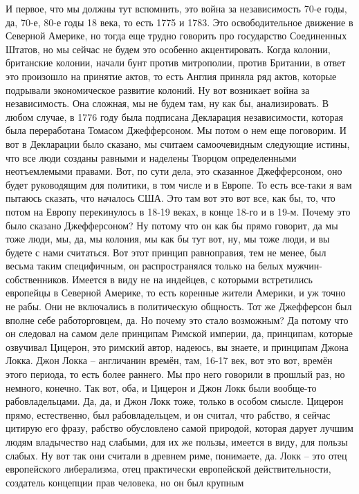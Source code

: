И первое, что мы
должны тут вспомнить, это война за независимость 70-е годы, да, 70-е, 80-е годы
18 века, то есть 1775 и 1783. Это освободительное движение в Северной Америке,
но тогда еще трудно говорить про государство Соединенных Штатов, но мы сейчас не
будем это особенно акцентировать. Когда колонии, британские колонии, начали бунт
против митрополии, против Британии, в ответ это произошло на принятие актов, то
есть Англия приняла ряд актов, которые подрывали экономическое развитие колоний.
Ну вот возникает война за независимость. Она сложная, мы не будем там, ну как
бы, анализировать. В любом случае, в 1776 году была подписана Декларация
независимости, которая была переработана Томасом Джефферсоном. Мы потом о нем
еще поговорим. И вот в Декларации было сказано, мы считаем самоочевидным
следующие истины, что все люди созданы равными и наделены Творцом определенными
неотъемлемыми правами. Вот, по сути дела, это сказанное Джефферсоном, оно будет
руководящим для политики, в том числе и в Европе. То есть все-таки я вам пытаюсь
сказать, что началось США. Это там вот это вот все, как бы, то, что потом на
Европу перекинулось в 18-19 веках, в конце 18-го и в 19-м. Почему это было
сказано Джефферсоном? Ну потому что он как бы прямо говорит, да мы тоже люди,
мы, да, мы колония, мы как бы тут вот, ну, мы тоже люди, и вы будете с нами
считаться. Вот этот принцип равноправия, тем не менее, был весьма таким
специфичным, он распространялся только на белых мужчин-собственников. Имеется в
виду не на индейцев, с которыми встретились европейцы в Северной Америке, то
есть коренные жители Америки, и уж точно не рабы. Они не включались в
политическую общность. Тот же Джефферсон был вполне себе работорговцем, да. Но
почему это стало возможным? Да потому что он следовал на самом деле принципам
Римской империи, да, принципам, которые озвучивал Цицерон, это римский автор,
надеюсь, вы знаете, и принципам Джона Локка. Джон Локка – англичанин времён,
там, 16-17 век, вот это вот, времён этого периода, то есть более раннего. Мы про
него говорили в прошлый раз, но немного, конечно. Так вот, оба, и Цицерон и Джон
Локк были вообще-то рабовладельцами. Да, да, и Джон Локк тоже, только в особом
смысле. Цицерон прямо, естественно, был рабовладельцем, и он считал, что
рабство, я сейчас цитирую его фразу, рабство обусловлено самой природой, которая
дарует лучшим людям владычество над слабыми, для их же пользы, имеется в виду,
для пользы слабых. Ну вот так они считали в древнем риме, понимаете, да. Локк –
это отец европейского либерализма, отец практически европейской
действительности, создатель концепции прав человека, но он был крупным
